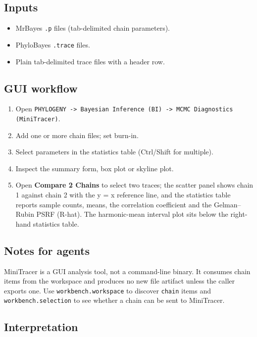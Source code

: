 \documentclass[11pt]{report}
\begin{document}
\subsection{Inputs}

\begin{itemize}
  \item MrBayes \texttt{.\allowbreak p} files (tab-delimited chain parameters).
  \item PhyloBayes \texttt{.\allowbreak trace} files.
  \item Plain tab-delimited trace files with a header row.
\end{itemize}

\subsection{GUI workflow}

\begin{enumerate}
  \item Open \texttt{PHYLOGENY -> Bayesian Inference \allowbreak (BI) -> MCMC Diagnostics \allowbreak (MiniTracer)}.
  \item Add one or more chain files; set burn-in.
  \item Select parameters in the statistics table (Ctrl/Shift for multiple).
  \item Inspect the summary form, box plot or skyline plot.
  \item Open \textbf{Compare 2 Chains} to select two traces; the scatter panel shows chain 1 against chain 2 with the y = x reference line, and the statistics table reports sample counts, means, the correlation coefficient and the Gelman--Rubin PSRF (R-hat). The harmonic-mean interval plot sits below the right-hand statistics table.
\end{enumerate}

\subsection{Notes for agents}

MiniTracer is a GUI analysis tool, not a command-line binary. It consumes chain items from the workspace and produces no new file artifact unless the caller exports one. Use \texttt{workbench.\allowbreak workspace} to discover \texttt{chain} items and \texttt{workbench.\allowbreak selection} to see whether a chain can be sent to MiniTracer.

\subsection{Interpretation}
\end{document}
